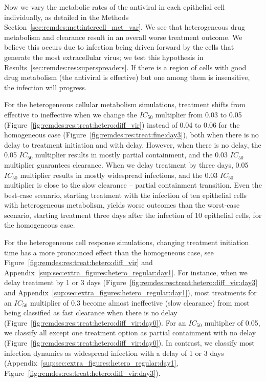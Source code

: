 Now we vary the metabolic rates of the antiviral in each epithelial cell individually, as detailed in the Methods Section~\ref{sec:remdes:met:intercell_met_var}. We see that heterogeneous drug metabolism and clearance result in an overall worse treatment outcome. We believe this occurs due to infection being driven forward by the cells that generate the most extracellular virus; we test this hypothesis in Results~\ref{sec:remdes:res:superspreaders}. If there is a region of cells with good drug metabolism (the antiviral is effective) but one among them is insensitive, the infection will progress.

For the heterogeneous cellular metabolism simulations, treatment shifts from effective to ineffective when we change the $IC_{50}$ multiplier from 0.03 to 0.05 (Figure~\ref{fig:remdes:res:treat:hetero:diff_vir}) instead of 0.04 to 0.06 for the homogeneous case  (Figure~\ref{fig:remdes:res:treat:fine:day3}), both when there is no delay to treatment initiation and with delay. However, when there is no delay, the 0.05 $IC_{50}$ multiplier results in mostly partial containment, and the 0.03  $IC_{50}$ multiplier guarantees clearance. When we delay treatment by three days, 0.05 $IC_{50}$ multiplier results in mostly widespread infections, and the 0.03 $IC_{50}$ multiplier is close to the slow clearance -- partial containment transition. Even the best-case scenario, starting treatment with the infection of ten epithelial cells with heterogeneous metabolism, yields worse outcomes than the worst-case scenario, starting treatment three days after the infection of 10 epithelial cells, for the homogeneous case.  

For the heterogeneous cell response simulations, changing treatment initiation time has a more pronounced effect than the homogeneous case,  see Figure~\ref{fig:remdes:res:treat:hetero:diff_vir} and Appendix~\ref{sup:sec:extra_figures:hetero_regular:day1}. For instance, when we delay treatment by 1 or 3 days  (Figure~\ref{fig:remdes:res:treat:hetero:diff_vir:day3} and Appendix~\ref{sup:sec:extra_figures:hetero_regular:day1}), most treatments for an $IC_{50}$ multiplier of 0.3 become almost ineffective (slow clearance) from most being classified as fast clearance when there is no delay (Figure~\ref{fig:remdes:res:treat:hetero:diff_vir:day0}). For an $IC_{50}$ multiplier of 0.05, we classify all except one treatment option as partial containment with no delay (Figure~\ref{fig:remdes:res:treat:hetero:diff_vir:day0}). In contrast, we classify most infection dynamics as widespread infection with a delay of 1 or 3 days (Appendix~\ref{sup:sec:extra_figures:hetero_regular:day1}, Figure~\ref{fig:remdes:res:treat:hetero:diff_vir:day3}).

